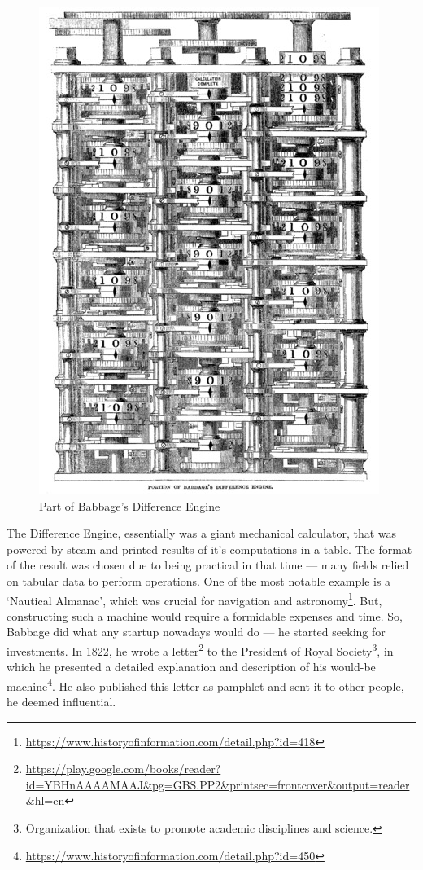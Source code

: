 \documentclass[../../what-is-computer]{subfiles}
\begin{document}
    \begin{figure}
        \centering
        \includegraphics[scale=0.25]{images/devices/device_babbage_difference_engine.jpg}
        \caption{Part of Babbage's Difference Engine}
    \end{figure}


    The Difference Engine, essentially was a giant mechanical calculator, that was powered by steam and printed results of it's computations in a table. 
    The format of the result was chosen due to being practical in that time --- many fields relied on tabular data to perform operations. One of the most
    notable example is a `Nautical Almanac', which was crucial for navigation and astronomy\footnote{\href{https://www.historyofinformation.com/detail.php?id=418}
    {https://www.historyofinformation.com/detail.php?id=418}}. But, constructing such a machine would require a formidable expenses and time. So, Babbage did what
    any startup nowadays would do --- he started seeking for investments. 
    In 1822, he wrote a letter\footnote{\href{https://play.google.com/books/reader?id=YBHnAAAAMAAJ&pg=GBS.PP2&printsec=frontcover&output=reader&hl=en}
    {https://play.google.com/books/reader?id=YBHnAAAAMAAJ\&pg=GBS.PP2\&printsec=frontcover\&output=reader\&hl=en}}
    to the President of Royal Society\footnote{Organization that exists to promote academic disciplines and science.}, in which he presented a 
    detailed explanation and description of his would-be machine\footnote{\href{https://www.historyofinformation.com/detail.php?id=450}
    {https://www.historyofinformation.com/detail.php?id=450}}. He also published this letter as pamphlet and sent it to other people, he deemed influential. \par
\end{document}
